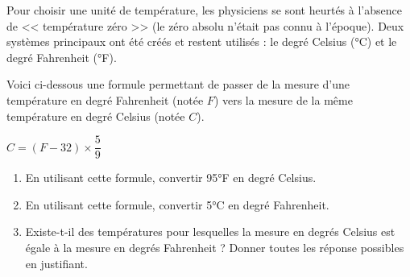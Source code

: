 Pour choisir une unité de température, les physiciens se sont heurtés à l’absence de << température zéro >> (le zéro absolu n’était pas connu à l’époque). Deux systèmes principaux ont été créés et restent utilisés : le degré Celsius (°C) et le degré Fahrenheit (°F). \par
Voici ci-dessous une formule permettant de passer de la mesure d’une température en degré Fahrenheit (notée $F$) vers la mesure de la même température en degré Celsius (notée $C$).
\begin{center}
   $C =(F-32)\times\dfrac59$
\end{center}
\begin{enumerate}
   \setlength{\itemsep}{-1mm}
   \item En utilisant cette formule, convertir 95°F en degré Celsius.
   \item En utilisant cette formule, convertir 5°C en degré Fahrenheit.
   \item Existe-t-il des températures pour lesquelles la mesure en degrés Celsius est égale à la mesure en degrés Fahrenheit ? Donner toutes les réponse possibles en justifiant.
\end{enumerate}